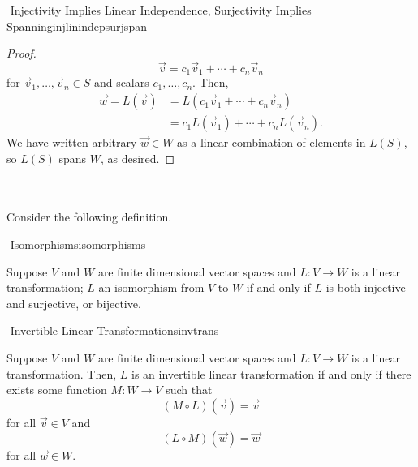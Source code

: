 \begin{theorem}{\Stop\,\,Injectivity Implies Linear Independence, Surjectivity Implies Spanning}{injlinindepsurjspan}
\begin{enumerate}
\begin{proof}
                    \begin{equation*}
                        \vec{v}=c_1\vec{v}_1+\cdots+c_n\vec{v}_n
                    \end{equation*}
                    for \(\vec{v}_1,\ldots,\vec{v}_n\in S\) and scalars \(c_1,\ldots,c_n\). Then, 
                    \begin{align*}
                        \vec{w}=L(\vec{v})&=L(c_1\vec{v}_1+\cdots+c_n\vec{v}_n) \\
                        &=c_1L(\vec{v}_1)+\cdots+c_nL(\vec{v}_n).
                    \end{align*}
                    We have written arbitrary \(\vec{w}\in W\) as a linear combination of elements in \(L(S)\), so \(L(S)\) spans \(W\), as desired.
                \end{proof}
            \end{enumerate}
            
        \end{theorem}
        \pagebreak
        \vphantom
        \\
        \\
        Consider the following definition.
        \begin{definition}{\Stop\,\,Isomorphisms}{isomorphisms}

            Suppose \(V\) and \(W\) are finite dimensional vector spaces and \(L:V\to W\) is a linear transformation; \(L\) an isomorphism from \(V\) to \(W\) if and only if \(L\) is both injective and surjective, or bijective.
            
        \end{definition}
        \begin{definition}{\Stop\,\,Invertible Linear Transformations}{invtrans}

            Suppose \(V\) and \(W\) are finite dimensional vector spaces and \(L:V\to W\) is a linear transformation. Then, \(L\) is an invertible linear transformation if and only if there exists some function \(M:W\to V\) such that
            \begin{equation*}
                (M\circ L)(\vec{v})=\vec{v}
            \end{equation*}
            for all \(\vec{v}\in V\) and
            \begin{equation*}
                (L\circ M)(\vec{w})=\vec{w}
            \end{equation*}
            for all \(\vec{w}\in W\).
            
        \end{definition}

